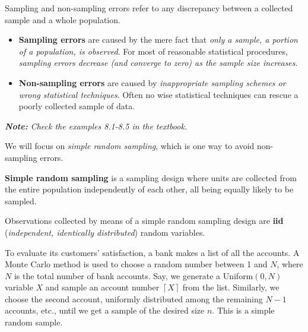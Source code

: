 Sampling and non-sampling errors refer to any discrepancy between a collected sample and a whole population.
\begin{itemize}
  \item \textbf{Sampling errors} are caused by the mere fact that \textit{only a sample, a portion of a population, is observed}. For most of reasonable statistical procedures, \textit{sampling errors decrease (and converge to zero) as the sample size increases}.
  \item \textbf{Non-sampling errors} are caused by \textit{inappropriate sampling schemes or wrong statistical techniques}. Often no wise statistical techniques can rescue a poorly collected sample of data.
\end{itemize}

\noindent \textit{\textbf{Note:} Check the examples 8.1-8.5 in the textbook.}

We will focus on \textit{simple random sampling}, which is one way to avoid non-sampling errors.

\begin{definition}{}
  \textbf{Simple random sampling} is a sampling design where units are collected from the entire population independently of each other, all being equally likely to be sampled.
\end{definition}

Observations collected by means of a simple random sampling design are \textbf{iid} (\textit{independent, identically distributed}) random variables.

\begin{example}{}
  To evaluate its customers' satisfaction, a bank makes a list of all the accounts. A Monte Carlo method is used to choose a random number between 1 and $N$, where $N$ is the total number of bank accounts. Say, we generate a Uniform$(0,N)$ variable $X$ and sample an account number $\left\lceil X \right\rceil$ from the list. Similarly, we choose the second account, uniformly distributed among the remaining $N - 1$ accounts, etc., until we get a sample of the desired size $n$. This is a simple random sample.
\end{example}
